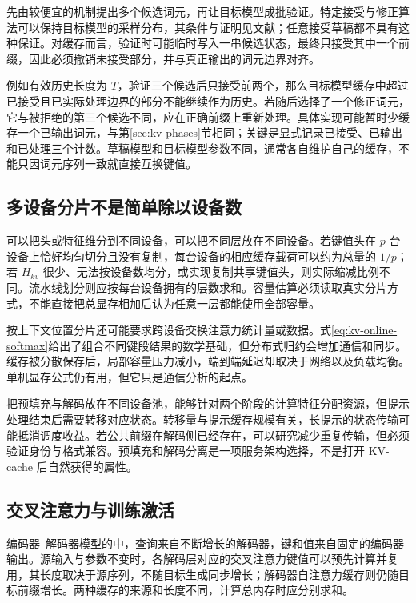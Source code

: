 \documentclass[UTF8,12pt,a4paper,fontset=fandol]{ctexart}
\begin{document}
先由较便宜的机制提出多个候选词元，再让目标模型成批验证。特定接受与修正算法可以保持目标模型的采样分布，其条件与证明见文献\cite{speculative}；任意接受草稿都不具有这种保证。对缓存而言，验证时可能临时写入一串候选状态，最终只接受其中一个前缀，因此必须撤销未接受部分，并与真正输出的词元边界对齐。

例如有效历史长度为 $T$，验证三个候选后只接受前两个，那么目标模型缓存中超过已接受且已实际处理边界的部分不能继续作为历史。若随后选择了一个修正词元，它与被拒绝的第三个候选不同，应在正确前缀上重新处理。具体实现可能暂时少缓存一个已输出词元，与第\ref{sec:kv-phases}节相同；关键是显式记录已接受、已输出和已处理三个计数。草稿模型和目标模型参数不同，通常各自维护自己的缓存，不能只因词元序列一致就直接互换键值。

\subsection{多设备分片不是简单除以设备数}

可以把头或特征维分到不同设备，可以把不同层放在不同设备。若键值头在 $p$ 台设备上恰好均匀切分且没有复制，每台设备的相应缓存载荷可以约为总量的 $1/p$；若 $H_{kv}$ 很少、无法按设备数均分，或实现复制共享键值头，则实际缩减比例不同。流水线划分则应按每台设备拥有的层数求和。容量估算必须读取真实分片方式，不能直接把总显存相加后认为任意一层都能使用全部容量。

按上下文位置分片还可能要求跨设备交换注意力统计量或数据。式\eqref{eq:kv-online-softmax}给出了组合不同键段结果的数学基础，但分布式归约会增加通信和同步。缓存被分散保存后，局部容量压力减小，端到端延迟却取决于网络以及负载均衡。单机显存公式仍有用，但它只是通信分析的起点。

把预填充与解码放在不同设备池，能够针对两个阶段的计算特征分配资源，但提示处理结束后需要转移对应状态。转移量与提示缓存规模有关，长提示的状态传输可能抵消调度收益。若公共前缀在解码侧已经存在，可以研究减少重复传输，但必须验证身份与格式兼容。预填充和解码分离是一项服务架构选择，不是打开 KV-cache 后自然获得的属性。

\subsection{交叉注意力与训练激活}

编码器--解码器模型的中，查询来自不断增长的解码器，键和值来自固定的编码器输出。源输入与参数不变时，各解码层对应的交叉注意力键值可以预先计算并复用，其长度取决于源序列，不随目标生成同步增长；解码器自注意力缓存则仍随目标前缀增长。两种缓存的来源和长度不同，计算总内存时应分别求和。
\end{document}

